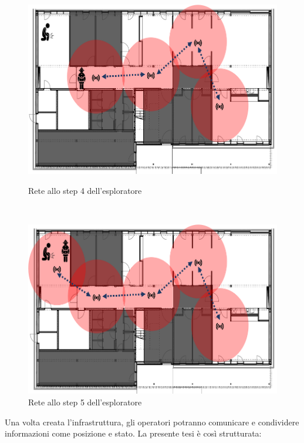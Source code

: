 \begin{figure}[h]
	\begin{minipage}[b]{6cm}
		\centering
		\includegraphics[scale=0.35]{Introduzione/intervento_step_4.png}
		\caption{Rete allo step 4 dell'esploratore}
		\label{fig:step4}
	\end{minipage}
	\ \hspace{10 mm} \
	\begin{minipage}[b]{6cm}
		\centering
		\includegraphics[scale=0.35]{Introduzione/intervento_step_5.png}
		\caption{Rete allo step 5 dell'esploratore}
		\label{fig:step5}
	\end{minipage}
\end{figure}
\newpage
Una volta creata l’infrastruttura, gli operatori potranno comunicare e condividere informazioni come posizione e stato. \newline
La presente tesi è così strutturata:
